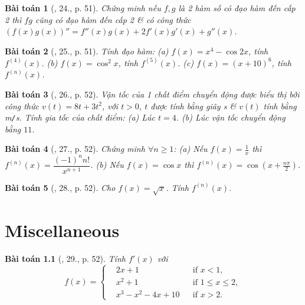 \documentclass[oneside]{book}
\newtheorem{baitoan}{Bài toán}
\begin{document}
\begin{baitoan}[\cite{TLCT_BT_dai_so_giai_tich_11}, 24., p. 51]
	Chứng minh nếu $f,g$ là 2 hàm số có đạo hàm đến cấp 2 thì $fg$ cũng có đạo hàm đến cấp 2 \& có công thức $(f(x)g(x))'' = f''(x)g(x) + 2f'(x)g'(x) + g''(x)$.
\end{baitoan}

\begin{baitoan}[\cite{TLCT_BT_dai_so_giai_tich_11}, 25., p. 51]
	Tính đạo hàm: (a) $f(x) = x^4 - \cos2x$, tính $f^{(4)}(x)$. (b) $f(x) = \cos^2x$, tính $f^{(5)}(x)$. (c) $f(x) = (x + 10)^6$, tính $f^{(n)}(x)$.
\end{baitoan}

\begin{baitoan}[\cite{TLCT_BT_dai_so_giai_tich_11}, 26., p. 52]
	Vận tốc của 1 chất điểm chuyển động được biểu thị bởi công thức $v(t) = 8t + 3t^2$, với $t > 0$, $t$ được tính bằng giây {\rm s} \& $v(t)$ tính bằng {\rm m{\tt/}s}. Tính gia tốc của chất điểm: (a) Lúc $t = 4$. (b) Lúc vận tốc chuyển động bằng $11$.
\end{baitoan}

\begin{baitoan}[\cite{TLCT_BT_dai_so_giai_tich_11}, 27., p. 52]
	Chứng minh $\forall n\ge1$: (a) Nếu $f(x) = \frac{1}{x}$ thì $f^{(n)}(x) = \dfrac{(-1)^nn!}{x^{n+1}}$. (b) Nếu $f(x) = \cos x$ thì $f^{(n)}(x) = \cos\left(x + \frac{n\pi}{2}\right)$.
\end{baitoan}

\begin{baitoan}[\cite{TLCT_BT_dai_so_giai_tich_11}, 28., p. 52]
	Cho $f(x) = \sqrt{x}$. Tính $f^{(n)}(x)$.
\end{baitoan}


\chapter{Miscellaneous}
\minitoc

\begin{baitoan}[\cite{TLCT_BT_dai_so_giai_tich_11}, 29., p. 52]
	Tính $f'(x)$ với
	\begin{equation}
		f(x) = \left\{\begin{split}
			&2x + 1&&\mbox{if } x < 1,\\
			&x^2 + 1&&\mbox{if } 1\le x\le2,\\
			&x^3 - x^2 - 4x + 10&&\mbox{if } x > 2.
		\end{split}\right.
	\end{equation}
\end{baitoan}
\end{document}
